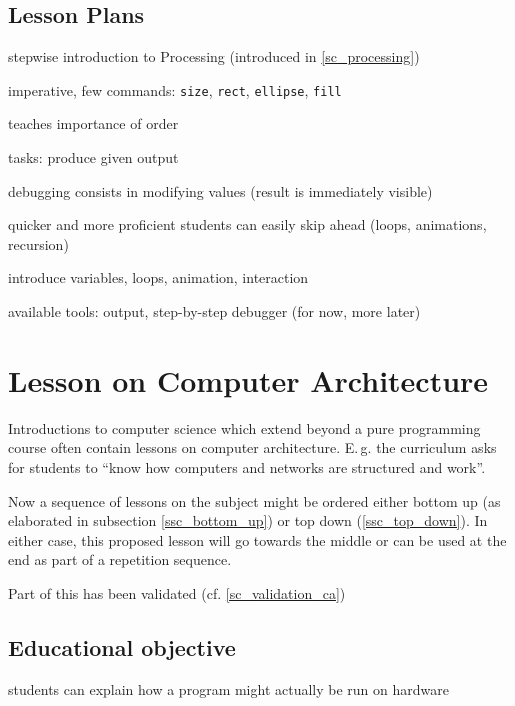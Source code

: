 \subsection{Lesson Plans}

\begin{todo}
\item stepwise introduction to Processing (introduced in \ref{sc_processing})
\item imperative, few commands: \texttt{size}, \texttt{rect}, \texttt{ellipse}, \texttt{fill}
\item teaches importance of order
\item tasks: produce given output
\item debugging consists in modifying values (result is immediately visible)
\item quicker and more proficient students can easily skip ahead (loops, animations, recursion)
\item introduce variables, loops, animation, interaction
\item available tools: output, step-by-step debugger (for now, more later)
\end{todo}



\section{Lesson on Computer Architecture} \label{sc_lesson_ca}
Introductions to computer science which extend beyond a pure programming course often contain lessons on computer architecture. E.\,g. the curriculum \cite[p.\,145]{Erz16} asks for students to ``know how computers and networks are structured and work''.

Now a sequence of lessons on the subject might be ordered either bottom up (as elaborated in subsection \ref{ssc_bottom_up}) or top down (\ref{ssc_top_down}). In either case, this proposed lesson will go towards the middle or can be used at the end as part of a repetition sequence.

Part of this has been validated (cf. \ref{sc_validation_ca})


\subsection{Educational objective}

\begin{todo}
\item students can explain how a program might actually be run on hardware
\end{todo}


